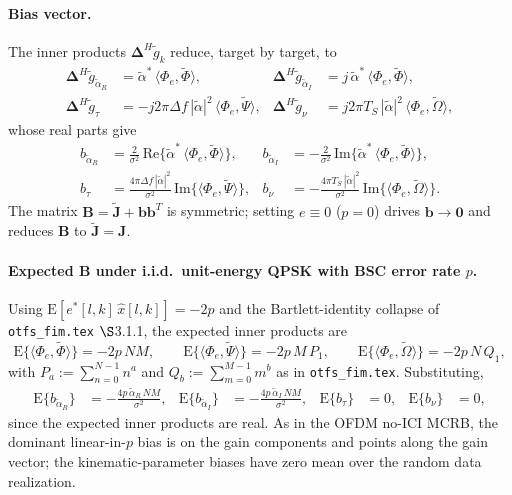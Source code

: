 \documentclass[11pt]{article}
\begin{document}
\paragraph{Bias vector.} The inner products \(\bm{\Delta}^H \tilde{g}_k\) reduce, target by target, to
\begin{align}
    \bm{\Delta}^H \tilde{g}_{\tilde{\alpha}_R} &= \tilde{\alpha}^*\, \langle \Phi_e, \tilde{\Phi}\rangle, &
    \bm{\Delta}^H \tilde{g}_{\tilde{\alpha}_I} &= j\, \tilde{\alpha}^*\, \langle \Phi_e, \tilde{\Phi}\rangle, \\
    \bm{\Delta}^H \tilde{g}_\tau &= -j2\pi\Delta f\, |\tilde{\alpha}|^2\, \langle \Phi_e, \tilde{\Psi}\rangle, &
    \bm{\Delta}^H \tilde{g}_\nu &= j2\pi T_S\, |\tilde{\alpha}|^2\, \langle \Phi_e, \tilde{\Omega}\rangle,
\end{align}
whose real parts give
\begin{align}
    b_{\tilde{\alpha}_R} &= \tfrac{2}{\sigma^2}\, \mathrm{Re}\{\tilde{\alpha}^*\, \langle \Phi_e, \tilde{\Phi}\rangle\}, &
    b_{\tilde{\alpha}_I} &= -\tfrac{2}{\sigma^2}\, \mathrm{Im}\{\tilde{\alpha}^*\, \langle \Phi_e, \tilde{\Phi}\rangle\}, \\
    b_\tau &= \tfrac{4\pi\Delta f\, |\tilde{\alpha}|^2}{\sigma^2}\, \mathrm{Im}\{\langle \Phi_e, \tilde{\Psi}\rangle\}, &
    b_\nu &= -\tfrac{4\pi T_S\, |\tilde{\alpha}|^2}{\sigma^2}\, \mathrm{Im}\{\langle \Phi_e, \tilde{\Omega}\rangle\}.
\end{align}
The matrix \(\bm{B} = \tilde{\bm{J}} + \bm{b}\bm{b}^T\) is symmetric; setting \(e \equiv 0\) (\(p = 0\)) drives \(\bm{b} \to \bm{0}\) and reduces \(\bm{B}\) to \(\tilde{\bm{J}} = \bm{J}\).

\paragraph{Expected \(\bm{B}\) under i.i.d.\ unit-energy QPSK with BSC error rate \(p\).} Using \(\mathrm{E}[e^*[l,k]\, \hat{x}[l,k]] = -2p\) and the Bartlett-identity collapse of \texttt{otfs\_fim.tex} \(\S\)3.1.1, the expected inner products are
\begin{equation}
    \mathrm{E}\{\langle \Phi_e, \tilde{\Phi}\rangle\} = -2p\, NM, \qquad
    \mathrm{E}\{\langle \Phi_e, \tilde{\Psi}\rangle\} = -2p\, M\, P_1, \qquad
    \mathrm{E}\{\langle \Phi_e, \tilde{\Omega}\rangle\} = -2p\, N\, Q_1,
\end{equation}
with \(P_a := \sum_{n=0}^{N-1} n^a\) and \(Q_b := \sum_{m=0}^{M-1} m^b\) as in \texttt{otfs\_fim.tex}. Substituting,
\begin{align}
    \mathrm{E}\{b_{\tilde{\alpha}_R}\} &= -\tfrac{4p\, \tilde{\alpha}_R\, NM}{\sigma^2}, &
    \mathrm{E}\{b_{\tilde{\alpha}_I}\} &= -\tfrac{4p\, \tilde{\alpha}_I\, NM}{\sigma^2}, &
    \mathrm{E}\{b_\tau\} &= 0, &
    \mathrm{E}\{b_\nu\} &= 0,
\end{align}
since the expected inner products are real. As in the OFDM no-ICI MCRB, the dominant linear-in-\(p\) bias is on the gain components and points along the gain vector; the kinematic-parameter biases have zero mean over the random data realization.
\end{document}
